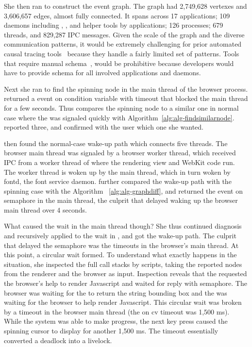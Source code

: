 She then ran \xxx to construct the event graph. The graph had 2,749,628 vertexes
and 3,606,657 edges, almost fully connected. It spans across 17 applications;
109 daemons including , ,  and
helper tools by applications; 126 processes; 679 threads, and 829,287
IPC messages. Given the scale of the graph and the diverse communication
patterns, it would be extremely challenging for prior automated causal tracing
tools~\cite{aguilera2003performance, zhang2013panappticon, attariyan2012x,
cohen2004correlating} because they handle a fairly limited set of patterns.
Tools that require manual schema~\cite{barham2004using, reynolds2006pip}, would
be prohibitive because developers would have to provide schema for all involved
applications and daemons.

Next she ran \xxx to find the spinning node in the main thread of the browser
process. \xxx returned a  event on condition variable with timeout that
blocked the main thread for a few seconds. Thus \xxx compares the spinning node
to a similar one in normal case where the  was signaled quickly with
Algorithm~\ref{alg:alg-findsimilarnode}. \xxx reported three, and confirmed with
the user which one she wanted.

\xxx then found the normal-case wake-up path which connects five threads. The
browser main thread was signaled by a browser worker thread, which received IPC
from a worker thread of  where the rendering view and WebKit code
run. The worker thread is woken up by the  main thread, which in
turn woken by fontd, the font service daemon. \xxx further compared the wake-up
path with the spinning case with the Algorithm ~\ref{alg:alg-graphdiff}, and
returned the  event on semaphore in the  main thread, the
culprit that delayed waking up the browser main thread over 4 seconds.

What caused the wait in the  main thread though? She thus continued
diagnosis and recursively applied \xxx to the wait in , and got
the wake-up path. The culprit that delayed the semaphore was the timeouts in
the browser's main thread. At this point, a circular wait formed. To understand
what exactly happens in the situation, she inspected the full call stacks by
\xxx scripts, taking the reported nodes from the renderer and the browser as
input. Inspection reveals that the  requested the browser's help to
render Javascript and waited for reply with semaphore. The browser was waiting
for the  to return the string bounding box and the 
was waiting for the browser to help render Javascript. This circular wait was
broken by a timeout in the browser main thread (the  on cv timeout was
1,500 ms). While the system was able to make progress, the next key press caused
the spinning cursor to display for another 1,500 ms. The timeout essentially
converted a deadlock into a livelock.

